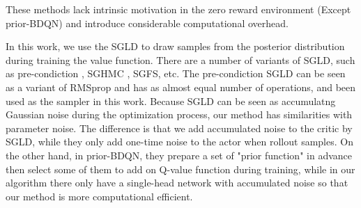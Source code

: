 These methods lack intrinsic motivation in the zero reward environment (Except prior-BDQN) and introduce considerable computational overhead. 

In this work, we use the SGLD to draw samples from the posterior distribution during training the value function. There are a number of variants of SGLD, such as pre-condiction \cite{pSGLD}, SGHMC \cite{SGHMC}, SGFS\cite{SGFS}, etc. The pre-condiction SGLD can be seen as a variant of RMSprop and has as almost equal number of operations, and been used as the sampler in this work. Because SGLD can be seen as accumulatng Gaussian noise during the optimization process, our method has similarities with parameter noise. The difference is that we add accumulated noise to the critic by SGLD, while they only add one-time noise to the actor when rollout samples. On the other hand, in prior-BDQN, they prepare a set of "prior function" in advance then select some of them to add on Q-value function during training, while in our algorithm there only have a single-head network with accumulated noise so that our method is more computational efficient.

